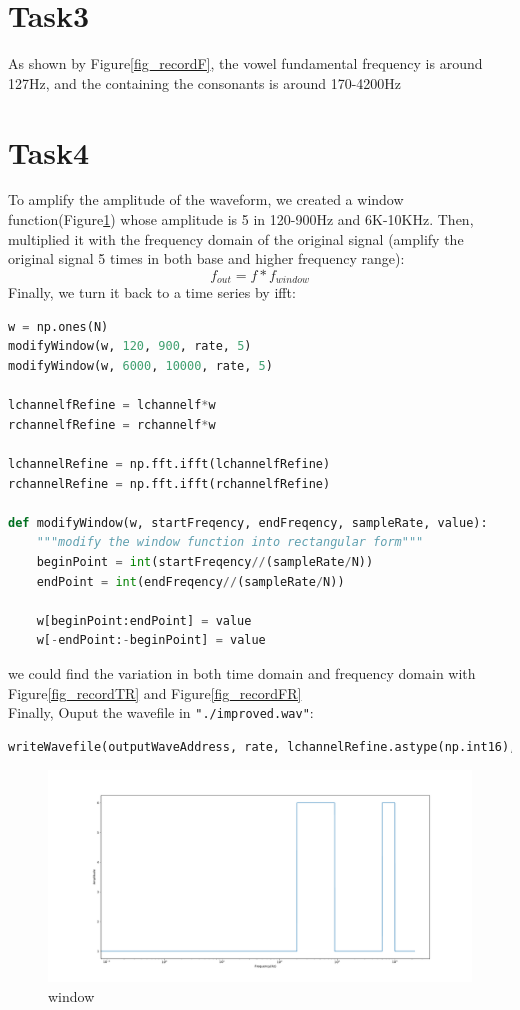 \documentclass[a4paper,12pt]{article}
\begin{document}
\section{Task3}
As shown by Figure\ref{fig_recordF}, the vowel fundamental frequency is around 127Hz, and the containing the consonants is around  170-4200Hz
\section{Task4}
To amplify the amplitude of the waveform,  we created a window function(Figure\ref{fig_window}) whose amplitude is 5 in 120-900Hz and 6K-10KHz. Then,  multiplied it with the frequency domain of the original signal (amplify the original signal 5 times in both base and higher frequency range):
$$f_{out}=f*f_{window}$$
Finally, we turn it back to a time series by ifft:
\begin{lstlisting}[language=Python]
w = np.ones(N)
modifyWindow(w, 120, 900, rate, 5)
modifyWindow(w, 6000, 10000, rate, 5)

lchannelfRefine = lchannelf*w
rchannelfRefine = rchannelf*w

lchannelRefine = np.fft.ifft(lchannelfRefine)
rchannelRefine = np.fft.ifft(rchannelfRefine)

def modifyWindow(w, startFreqency, endFreqency, sampleRate, value):
	"""modify the window function into rectangular form"""
	beginPoint = int(startFreqency//(sampleRate/N))
	endPoint = int(endFreqency//(sampleRate/N))
	
	w[beginPoint:endPoint] = value
	w[-endPoint:-beginPoint] = value
\end{lstlisting}
we could find the variation in both time domain and frequency domain with Figure\ref{fig_recordTR} and Figure\ref{fig_recordFR}\\
Finally, Ouput the wavefile in \lstinline{"./improved.wav"}:
\begin{lstlisting}[language=Python]
writeWavefile(outputWaveAddress, rate, lchannelRefine.astype(np.int16), rchannelRefine.astype(np.int16))
\end{lstlisting}
\begin{figure}[h]   
	\centering 
	\includegraphics[width=12cm]{../Output/Figures/window.pdf} 
	\caption{window}   
	\label{fig_window}
\end{figure}
\end{document}
